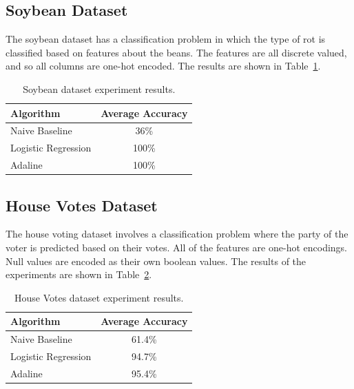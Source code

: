 \documentclass{amsart}
\begin{document}
    \subsection{Soybean Dataset}
    The soybean dataset\cite{soybeandataset} has a classification
    problem in which the type of rot is classified based on
    features about the beans. The features are all discrete
    valued, and so all columns are one-hot encoded. The results
    are shown in Table~\ref{soybean_results}.
    \begin{table}[H]
    \begin{tabular}{lc}
    Algorithm & Average Accuracy \\
    \hline
    Naive Baseline & 36\% \\
    Logistic Regression & 100\% \\
    Adaline & 100\%
    \end{tabular}
    \label{soybean_results}
    \caption{Soybean dataset experiment results.}
    \end{table}

    \subsection{House Votes Dataset}
    The house voting dataset\cite{housedataset} involves a classification
    problem where the party of the voter is predicted
    based on their votes. All of the features are one-hot encodings.
    Null values are encoded as their own boolean values.
    The results of the experiments are shown in Table~\ref{house_votes_results}.
    \begin{table}[H]
    \begin{tabular}{lc}
    Algorithm & Average Accuracy \\
    \hline
    Naive Baseline & 61.4\% \\
    Logistic Regression & 94.7\% \\
    Adaline & 95.4\%
    \end{tabular}
    \label{house_votes_results}
    \caption{House Votes dataset experiment results.}
    \end{table}





\end{document}
